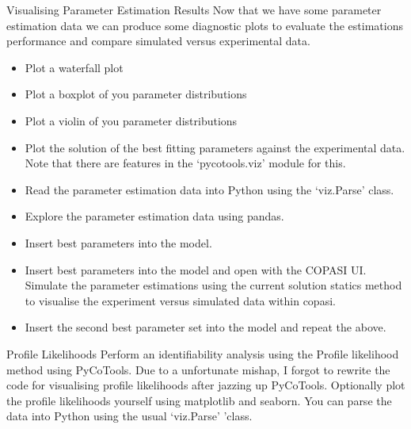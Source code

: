 \documentclass[../../main]{subfiles}
\begin{document}
\begin{Task}[label=VizPE]{Visualising Parameter Estimation Results}
    Now that we have some parameter estimation data we can produce some diagnostic plots
    to evaluate the estimations performance and compare simulated versus experimental data.

    \begin{itemize}
        \item Plot a waterfall plot
        \item Plot a boxplot of you parameter distributions
        \item Plot a violin of you parameter distributions
        \item Plot the solution of the best fitting parameters against the experimental data. Note
        that there are features in the `pycotools.viz' module for this.
        \item Read the parameter estimation data into Python using the `viz.Parse' class.
        \item Explore the parameter estimation data using pandas.
        \item Insert best parameters into the model.
        \item Insert best parameters into the model and open with the COPASI UI. Simulate the
        parameter estimations using the current solution statics method to visualise the experiment
        versus simulated data within copasi.
        \item Insert the second best parameter set into the model and repeat the above.
    \end{itemize}

\end{Task}

\begin{Task}[label=ProfileLikelihoods]{Profile Likelihoods}
    Perform an identifiability analysis using the Profile likelihood method using PyCoTools. Due to a
    unfortunate mishap, I forgot to rewrite the code for visualising profile likelihoods after jazzing up
    PyCoTools. Optionally plot the profile likelihoods yourself using matplotlib and seaborn. You can parse the
    data into Python using the usual `viz.Parse' 'class.
\end{Task}
\end{document}
